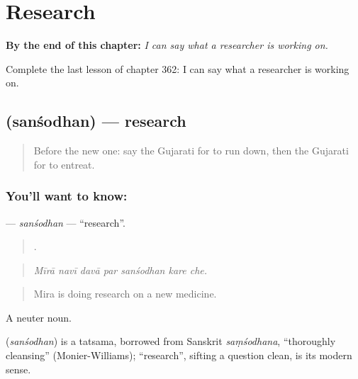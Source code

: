 
\chapter{Research}
\label{ch:gu-research}

\begin{chapteropening}
\textbf{By the end of this chapter:} \emph{I can say what a researcher is working on.}

Complete the last lesson of chapter 362: I can say what a researcher is working on.
\end{chapteropening}

\section[\texorpdfstring{\gu{સંશોધન} (sanśodhan)}{સંશોધન (sanśodhan)}]{ (sanśodhan) — research}

\label{lesson:GU-C362-sansodhan}



\begin{quote}
Before the new one: say the Gujarati for to run down, then the Gujarati for to entreat.
\end{quote}

\subsection*{You'll want to know: }
\textbf{} — \emph{sanśodhan} — \textquotedblleft{}research\textquotedblright{}.

\begin{quote}
      .
\end{quote}

\begin{quote}
\emph{Mīrā navī davā par sanśodhan kare che.}
\end{quote}

\begin{quote}
Mira is doing research on a new medicine.
\end{quote}

A neuter noun.

\begin{cousinweb}
\textbf{} (\emph{sanśodhan}) is a tatsama, borrowed from Sanskrit \emph{saṃśodhana}, \textquotedblleft{}thoroughly cleansing\textquotedblright{} (Monier-Williams); \textquotedblleft{}research\textquotedblright{}, sifting a question clean, is its modern sense.
\end{cousinweb}

